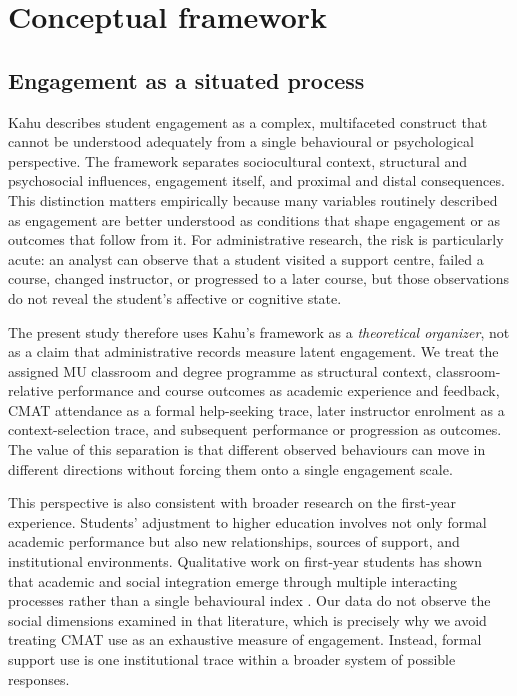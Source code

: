 \section{Conceptual framework}

\subsection{Engagement as a situated process}

Kahu \citep{kahu2013} describes student engagement as a complex, multifaceted construct that cannot be understood adequately from a single behavioural or psychological perspective. The framework separates sociocultural context, structural and psychosocial influences, engagement itself, and proximal and distal consequences. This distinction matters empirically because many variables routinely described as engagement are better understood as conditions that shape engagement or as outcomes that follow from it. For administrative research, the risk is particularly acute: an analyst can observe that a student visited a support centre, failed a course, changed instructor, or progressed to a later course, but those observations do not reveal the student's affective or cognitive state.

The present study therefore uses Kahu's framework as a \emph{theoretical organizer}, not as a claim that administrative records measure latent engagement. We treat the assigned MU classroom and degree programme as structural context, classroom-relative performance and course outcomes as academic experience and feedback, CMAT attendance as a formal help-seeking trace, later instructor enrolment as a context-selection trace, and subsequent performance or progression as outcomes. The value of this separation is that different observed behaviours can move in different directions without forcing them onto a single engagement scale.

This perspective is also consistent with broader research on the first-year experience. Students' adjustment to higher education involves not only formal academic performance but also new relationships, sources of support, and institutional environments. Qualitative work on first-year students has shown that academic and social integration emerge through multiple interacting processes rather than a single behavioural index \citep{wilcox2005}. Our data do not observe the social dimensions examined in that literature, which is precisely why we avoid treating CMAT use as an exhaustive measure of engagement. Instead, formal support use is one institutional trace within a broader system of possible responses.

